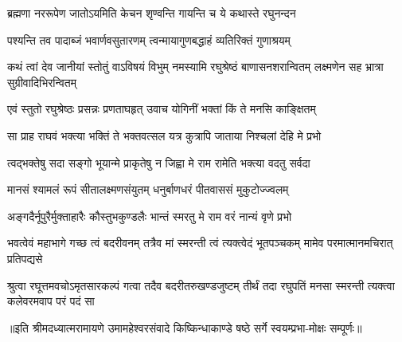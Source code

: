 \twolineshloka
{ब्रह्मणा नररूपेण जातोऽयमिति केचन}
{शृण्वन्ति गायन्ति च ये कथास्ते रघुनन्दन} %

\twolineshloka
{पश्यन्ति तव पादाब्जं भवार्णवसुतारणम्}
{त्वन्मायागुणबद्धाहं व्यतिरिक्तं गुणाश्रयम्} %

\threelineshloka
{कथं त्वां देव जानीयां स्तोतुं वाऽविषयं विभुम्}
{नमस्यामि रघुश्रेष्ठं बाणासनशरान्वितम्}
{लक्ष्मणेन सह भ्रात्रा सुग्रीवादिभिरन्वितम्} %

\twolineshloka
{एवं स्तुतो रघुश्रेष्ठः प्रसन्नः प्रणताघहृत्}
{उवाच योगिनीं भक्तां किं ते मनसि काङ्क्षितम्} %

\twolineshloka
{सा प्राह राघवं भक्त्या भक्तिं ते भक्तवत्सल}
{यत्र कुत्रापि जाताया निश्चलां देहि मे प्रभो} %

\twolineshloka
{त्वद्भक्तेषु सदा सङ्गो भूयान्मे प्राकृतेषु न}
{जिह्वा मे राम रामेति भक्त्या वदतु सर्वदा} %

\twolineshloka
{मानसं श्यामलं रूपं सीतालक्ष्मणसंयुतम्}
{धनुर्बाणधरं पीतवाससं मुकुटोज्ज्वलम्} %

\twolineshloka
{अङ्गदैर्नूपुरैर्मुक्ताहारैः कौस्तुभकुण्डलैः}
{भान्तं स्मरतु मे राम वरं नान्यं वृणे प्रभो} %


\threelineshloka
{भवत्वेवं महाभागे गच्छ त्वं बदरीवनम्}
{तत्रैव मां स्मरन्ती त्वं त्यक्त्वेदं भूतपञ्चकम्}
{मामेव परमात्मानमचिरात् प्रतिपद्यसे} %

\fourlineindentedshloka
{श्रुत्वा रघूत्तमवचोऽमृतसारकल्पं}
{गत्वा तदैव बदरीतरुखण्डजुष्टम्}
{तीर्थं तदा रघुपतिं मनसा स्मरन्ती}
{त्यक्त्वा कलेवरमवाप परं पदं सा} %

{॥इति श्रीमदध्यात्मरामायणे उमामहेश्वरसंवादे किष्किन्धाकाण्डे
षष्ठे सर्गे स्वयम्प्रभा-मोक्षः सम्पूर्णः॥}
